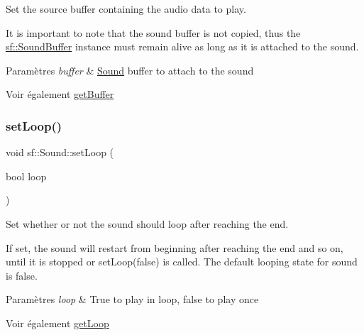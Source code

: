 Set the source buffer containing the audio data to play. 

It is important to note that the sound buffer is not copied, thus the \hyperlink{classsf_1_1SoundBuffer}{sf\+::\+Sound\+Buffer} instance must remain alive as long as it is attached to the sound.


\begin{DoxyParams}{Paramètres}
{\em buffer} & \hyperlink{classsf_1_1Sound}{Sound} buffer to attach to the sound\\
\hline
\end{DoxyParams}
\begin{DoxySeeAlso}{Voir également}
\hyperlink{classsf_1_1Sound_ab873727ae652c96b5a9437d7f8d8a44d}{get\+Buffer} 
\end{DoxySeeAlso}
\mbox{\label{classsf_1_1Sound_af23ab4f78f975bbabac031102321612b}} 
\subsubsection{\texorpdfstring{set\+Loop()}{setLoop()}}
{\footnotesize\ttfamily void sf\+::\+Sound\+::set\+Loop (\begin{DoxyParamCaption}\item[{bool}]{loop }\end{DoxyParamCaption})}



Set whether or not the sound should loop after reaching the end. 

If set, the sound will restart from beginning after reaching the end and so on, until it is stopped or set\+Loop(false) is called. The default looping state for sound is false.


\begin{DoxyParams}{Paramètres}
{\em loop} & True to play in loop, false to play once\\
\hline
\end{DoxyParams}
\begin{DoxySeeAlso}{Voir également}
\hyperlink{classsf_1_1Sound_a054da07266ce8f39229495146e3041eb}{get\+Loop} 
\end{DoxySeeAlso}
\mbox{\label{classsf_1_1Sound_ab905677846558042022dd6ab15cddff0}} 
